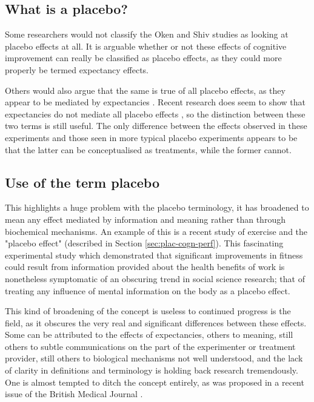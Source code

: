 \subsection{What is a placebo?}
\label{sec:what-placebo}



Some researchers would not classify the Oken and Shiv studies as looking at placebo effects at all. It is arguable whether or not these effects of cognitive improvement can really be classified as placebo effects, as they could more properly be termed expectancy effects. 

Others would also argue that the same is true of all placebo effects, as they appear to be mediated by expectancies \cite{Kirsch1985, Kirsch1997,Montgomery1997}. Recent research does seem to show that expectancies do not mediate all placebo effects \cite{benedetti2003a}, so the distinction between these two terms is still useful.  The only difference between the effects observed in these experiments and those seen in more typical placebo experiments appears to be that the latter can be conceptualised as treatments, while the former cannot. 

\subsection{Use of the term placebo}
\label{sec:use-term-placebo}



This highlights a huge problem with the placebo terminology, it has broadened to mean any effect mediated by information and meaning rather than through biochemical mechanisms. An example of this is a recent study of exercise and the "placebo effect" \cite{Crum2007} (described in Section \ref{sec:plac-cogn-perf}). This fascinating experimental study which demonstrated that significant improvements in fitness could result from information provided about the health benefits of work is nonetheless symptomatic of an obscuring trend in social science research; that of treating any influence of mental information on the body as a placebo effect. 

This kind of broadening of the concept is  useless to continued progress is the field, as it obscures the very real and significant differences between these effects. Some can be attributed to the effects of expectancies, others to meaning, still others to subtle communications on the part of the experimenter or treatment provider, still others to biological mechanisms not well understood, and the lack of clarity in definitions and terminology is holding back research tremendously. One is almost tempted to ditch the concept entirely, as was proposed in a recent issue of the British Medical Journal \cite{nunn2009s}. 

